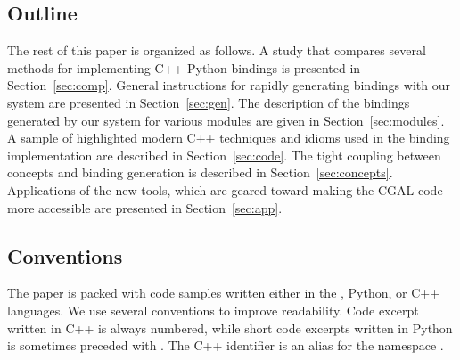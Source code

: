 \subsection{Outline}
\label{ssec:intro:outline}
The rest of this paper is organized as follows. A study that compares
several methods for implementing C++ Python bindings is presented
in Section~\ref{sec:comp}.
%
General instructions for rapidly generating bindings with our system 
are presented in Section~\ref{sec:gen}.
%
The description of the bindings generated by our system for various
modules are given in Section~\ref{sec:modules}.
%
A sample of highlighted modern C++ techniques and idioms used in the
binding implementation are described in Section~\ref{sec:code}.
%
The tight coupling between concepts and binding generation is
described in Section~\ref{sec:concepts}.
%
Applications of the new tools, which are geared toward making the CGAL
code more accessible are presented in Section~\ref{sec:app}.

\subsection{Conventions}
\label{ssec:intro:conventions}
The paper is packed with code samples written either in the \cmake{},
Python, or C++ languages. We use several conventions to improve
readability.  Code excerpt written in C++ is always numbered, while
short code excerpts written in Python is sometimes preceded with
\pyLstinline{>>>}. The C++ identifier  is an alias
for the namespace .

